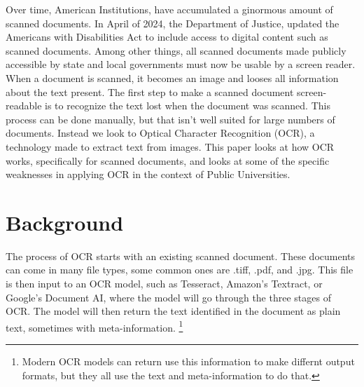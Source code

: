 \documentclass[sigplan,screen,nonacm]{acmart-tagged}
\begin{document}
Over time, American Institutions, have accumulated a ginormous amount of scanned documents.
In April of 2024, the Department of Justice, updated the Americans with Disabilities Act to include access to digital content such as scanned documents. Among other things, all scanned documents made publicly accessible by state and local governments must now be usable by a screen reader. When a document is scanned, it becomes an image and looses all information about the text present. The first step to  make a scanned document screen-readable is to recognize the text lost when the document was scanned. This process can be done manually, but that isn't well suited for large numbers of documents. Instead we look to Optical Character Recognition (OCR), a technology made to extract text from images. 
This paper looks at how OCR works, specifically for scanned documents, and looks at some of the specific weaknesses in applying OCR in the context of Public Universities.

\section{Background}
\label{sec:background}
The process of OCR starts with an existing scanned document. These documents can come in many file types, some common ones are .tiff, .pdf, and .jpg.
This file is then input to an OCR model, such as Tesseract, Amazon's Textract, or Google's Document AI, where the model will go through the three stages of OCR. The model will then return the text identified in the document as plain text, sometimes with meta-information. \footnote{Modern OCR models can return use this information to make differnt output formats, but they all use the text and meta-information to do that.}
\end{document}
